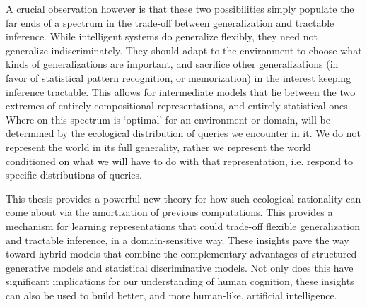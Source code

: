 A crucial observation however is that these two possibilities simply populate the far ends of a spectrum in the trade-off between generalization and tractable inference. While intelligent systems do generalize flexibly, they need not generalize indiscriminately. They should adapt to the environment to choose what kinds of generalizations are important, and sacrifice other generalizations (in favor of statistical pattern recognition, or memorization) in the interest keeping inference tractable. This allows for intermediate models that lie between the two extremes of entirely compositional representations, and entirely statistical ones. Where on this spectrum is `optimal' for an environment or domain, will be determined by the ecological distribution of queries we encounter in it. We do not represent the world in its full generality, rather we represent the world conditioned on what we will have to do with that representation, i.e. respond to specific distributions of queries. 

This thesis provides a powerful new theory for how such ecological rationality can come about via the amortization of previous computations. This provides a mechanism for learning representations that could trade-off flexible generalization and tractable inference, in a domain-sensitive way. These insights pave the way toward hybrid models that combine the complementary advantages of structured generative models and statistical discriminative models. Not only does this have significant implications for our understanding of human cognition, these insights can also be used to build better, and more human-like, artificial intelligence.







